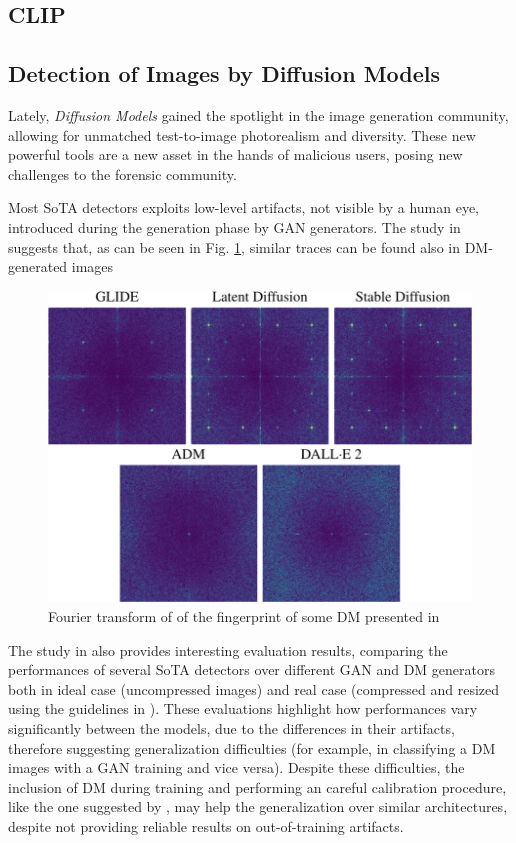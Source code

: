 \documentclass[conference]{IEEEtran} %
\begin{document}
    \subsection{CLIP}
    \subsection{Detection of Images by Diffusion Models} 
        Lately, \textit{Diffusion Models} gained the spotlight in the image generation community, allowing for unmatched test-to-image photorealism and diversity. These new powerful tools are a new asset in the hands of malicious users, posing new challenges to the forensic community. 

        Most SoTA detectors exploits low-level artifacts, not visible by a human eye, introduced during the generation phase by GAN generators. The study in \cite{corvi2023detection} suggests that, as can be seen in Fig. \ref{fig:pizza_fourier}, similar traces can be found also in DM-generated images

        \begin{figure}[h]
            \centering
            \includegraphics[width=0.8\linewidth]{Img/pizza_fourier.png}
            \caption{Fourier transform of of the fingerprint of some DM presented in \cite{corvi2023detection}}
            \label{fig:pizza_fourier}
        \end{figure}

        The study in \cite{corvi2023detection} also provides interesting evaluation results, comparing the performances of several SoTA detectors over different GAN and DM generators both in ideal case (uncompressed images) and real case (compressed and resized using the guidelines in \cite{vipcuplink}). These evaluations highlight how performances vary significantly between the models, due to the differences in their artifacts, therefore suggesting generalization difficulties (for example, in classifying a DM images with a GAN training and vice versa). Despite these difficulties, the inclusion of DM during training and performing an careful calibration procedure, like the one suggested by \cite{Platt1999probabilistic}, may help the generalization over similar architectures, despite not providing reliable results on out-of-training artifacts.
\end{document}
